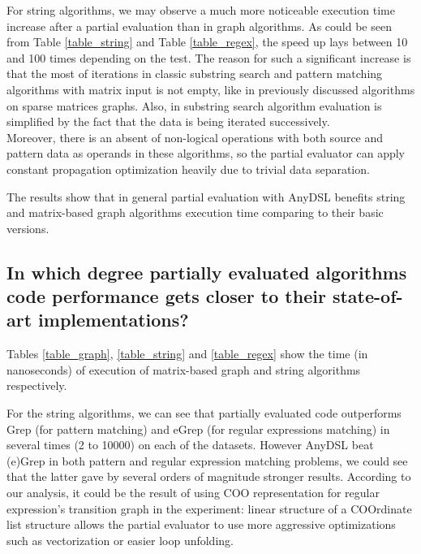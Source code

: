 \documentclass[conference]{IEEEtran}
\begin{document}
For string algorithms, we may observe a much more noticeable execution time increase after a partial evaluation than in graph algorithms. As could be seen from Table \ref{table_string} and Table \ref{table_regex}, the speed up lays between 10 and 100 times depending on the test. The reason for such a significant increase is that the most of iterations in classic substring search and pattern matching algorithms \cite{cormen2009introduction} with matrix input is not empty, like in previously discussed algorithms on sparse matrices graphs. Also, in substring search algorithm evaluation is simplified by the fact that the data is being iterated successively.\\
Moreover, there is an absent of non-logical operations with both source and pattern data as operands in these algorithms, so the partial evaluator can apply constant propagation optimization heavily due to trivial data separation.

The results show that in general partial evaluation with AnyDSL benefits string and matrix-based graph algorithms execution time comparing to their basic versions.


\begin{figure}
	\centering
\end{figure}

\subsection{In which degree partially evaluated algorithms code performance gets closer to their state-of-art implementations?}

Tables \ref{table_graph}, \ref{table_string} and \ref{table_regex} show the time (in nanoseconds) of execution of matrix-based graph and string algorithms respectively. 

For the string algorithms, we can see that partially evaluated code outperforms Grep (for pattern matching) and eGrep (for regular expressions matching) in several times (2 to 10000) on each of the datasets. However AnyDSL beat (e)Grep in both pattern and regular expression matching problems, we could see that the latter gave by several orders of magnitude stronger results. According to our analysis, it could be the result of using COO representation for regular expression's transition graph in the experiment: linear structure of a COOrdinate list structure allows the partial evaluator to use more aggressive optimizations such as vectorization or easier loop unfolding.
\end{document}
